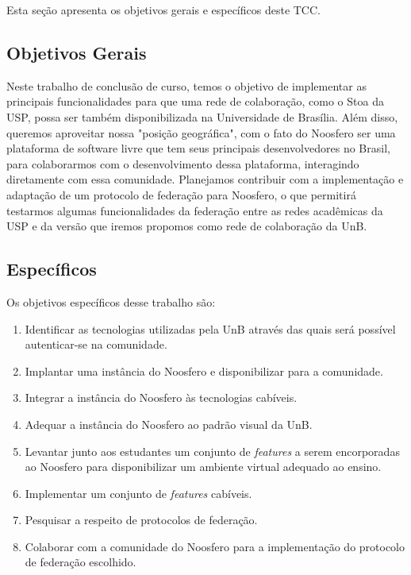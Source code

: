Esta seção apresenta os objetivos gerais e específicos deste TCC.

\subsection{Objetivos Gerais}

Neste trabalho de conclusão de curso, temos o objetivo de implementar as
principais funcionalidades para que uma rede de colaboração, como o Stoa da USP,
possa ser também disponibilizada na Universidade de Brasília. Além disso, queremos
aproveitar nossa "posição geográfica", com o fato do Noosfero ser uma plataforma
de software livre que tem seus principais desenvolvedores no Brasil, para
colaborarmos com o desenvolvimento dessa plataforma, interagindo diretamente com
essa comunidade. Planejamos contribuir com a implementação e adaptação de
um protocolo de federação para Noosfero, o que permitirá testarmos algumas
funcionalidades da federação entre as redes acadêmicas da USP e da versão que
iremos propomos como rede de colaboração da UnB.


\subsection{Específicos}

Os objetivos específicos desse trabalho são:

\begin{enumerate}
	
\item Identificar as tecnologias utilizadas pela UnB através das quais será
possível autenticar-se na comunidade.
\item Implantar uma instância do Noosfero e disponibilizar para a comunidade.
\item Integrar a instância do Noosfero às tecnologias cabíveis.
\item Adequar a instância do Noosfero ao padrão visual da UnB.
\item Levantar junto aos estudantes um conjunto de \textit{features} a serem
encorporadas ao Noosfero para disponibilizar um ambiente virtual adequado ao
ensino.
\item Implementar um conjunto de \textit{features} cabíveis.
\item Pesquisar a respeito de protocolos de federação.
\item Colaborar com a comunidade do Noosfero para a implementação do protocolo
de federação escolhido.

\end{enumerate}

